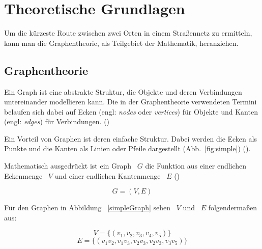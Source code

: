 \section{Theoretische Grundlagen}

Um die kürzeste Route zwischen zwei Orten in einem Straßennetz zu ermitteln, kann man die
Graphentheorie, als Teilgebiet der Mathematik, heranziehen.

\subsection{Graphentheorie}

Ein Graph ist eine abstrakte Struktur, die Objekte und deren Verbindungen untereinander modellieren kann.
Die in der Graphentheorie verwendeten Termini belaufen sich dabei auf Ecken (engl: \textit{nodes} oder \textit{vertices}) für Objekte und Kanten (engl: \textit{edges}) für Verbindungen.
(\cite[49]{kurt})

Ein Vorteil von Graphen ist deren einfache Struktur.
Dabei werden die Ecken als Punkte und die Kanten als Linien oder Pfeile dargestellt (Abb.~\ref{fig:simple}) (\cite[49]{kurt}).

Mathematisch ausgedrückt ist ein Graph ~$G$ die Funktion aus einer endlichen Eckenmenge ~$V$ und einer endlichen Kantenmenge ~$E$ (\cite[4]{theory})

	$$G = (V,E)$$

Für den Graphen in Abbildung ~\ref{simpleGraph} sehen ~$V$ und ~$E$ folgendermaßen aus:

$$V = \{(v_{1},v_{2},v_{3},v_{4},v_{5})\} $$
$$E = \{(v_{1}v_{2},v_{1}v_{3},v_{2}v_{3},v_{2}v_{3},v_{3}v_{5})\} $$

